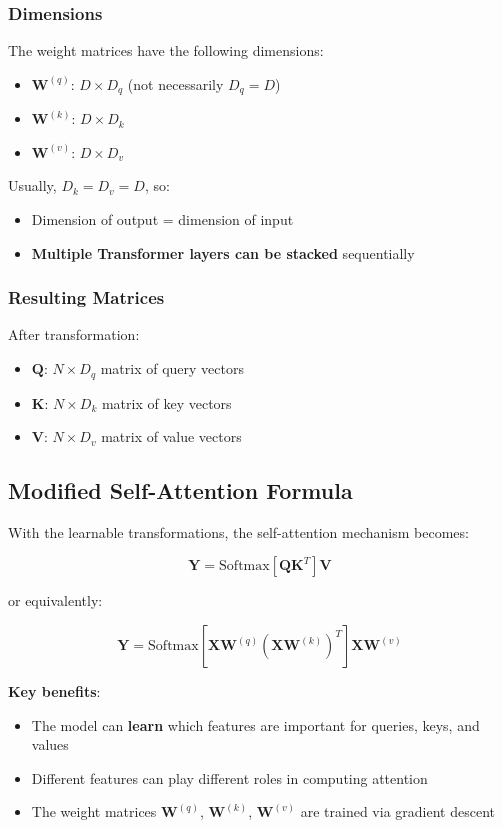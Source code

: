 \documentclass[11pt,a4paper]{article}
\theoremstyle{definition}
\theoremstyle{plain}
\theoremstyle{remark}
\begin{document}
\subsubsection{Dimensions}

The weight matrices have the following dimensions:
\begin{itemize}
    \item $\mathbf{W}^{(q)}$: $D \times D_q$ (not necessarily $D_q = D$)
    \item $\mathbf{W}^{(k)}$: $D \times D_k$
    \item $\mathbf{W}^{(v)}$: $D \times D_v$
\end{itemize}

Usually, $D_k = D_v = D$, so:
\begin{itemize}
    \item Dimension of output = dimension of input
    \item \textbf{Multiple Transformer layers can be stacked} sequentially
\end{itemize}

\subsubsection{Resulting Matrices}

After transformation:
\begin{itemize}
    \item $\mathbf{Q}$: $N \times D_q$ matrix of query vectors
    \item $\mathbf{K}$: $N \times D_k$ matrix of key vectors  
    \item $\mathbf{V}$: $N \times D_v$ matrix of value vectors
\end{itemize}

\subsection{Modified Self-Attention Formula}

With the learnable transformations, the self-attention mechanism becomes:

\[
\mathbf{Y} = \text{Softmax}\left[\mathbf{Q}\mathbf{K}^T\right]\mathbf{V}
\]

or equivalently:

\[
\mathbf{Y} = \text{Softmax}\left[\mathbf{X}\mathbf{W}^{(q)}\left(\mathbf{X}\mathbf{W}^{(k)}\right)^T\right]\mathbf{X}\mathbf{W}^{(v)}
\]

\textbf{Key benefits}:
\begin{itemize}
    \item The model can \textbf{learn} which features are important for queries, keys, and values
    \item Different features can play different roles in computing attention
    \item The weight matrices $\mathbf{W}^{(q)}$, $\mathbf{W}^{(k)}$, $\mathbf{W}^{(v)}$ are trained via gradient descent
\end{itemize}
\end{document}
